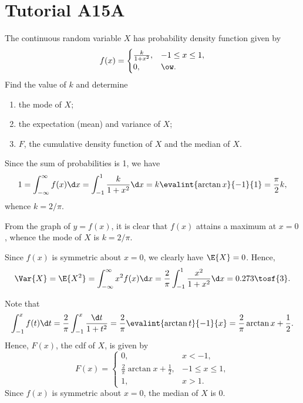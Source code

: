 \section{Tutorial A15A}

\begin{problem}
    The continuous random variable $X$ has probability density function given by \[f(x) = \begin{cases}
        \frac{k}{1 + x^2}, & -1 \leq x \leq 1,\\
        0, & \ow.
    \end{cases}\]
    Find the value of $k$ and determine
    \begin{enumerate}
        \item the mode of $X$;
        \item the expectation (mean) and variance of $X$;
        \item $F$, the cumulative density function of $X$ and the median of $X$.
    \end{enumerate}
\end{problem}
\begin{solution}
    Since the sum of probabilities is 1, we have \[1 = \int_{-\infty}^{\infty} f(x) \d x = \int_{-1}^1 \frac{k}{1 + x^2} \d x = k \evalint{\arctan x}{-1}{1} = \frac\pi2 k,\] whence $k = 2/\pi$.

    \begin{ppart}
        From the graph of $y = f(x)$, it is clear that $f(x)$ attains a maximum at $x = 0$, whence the mode of $X$ is $k = 2/\pi$.
    \end{ppart}
    \begin{ppart}
        Since $f(x)$ is symmetric about $x = 0$, we clearly have $\E{X} = 0$. Hence, \[\Var{X} = \E{X^2} = \int_{-\infty}^\infty x^2 f(x) \d x = \frac2\pi \int_{-1}^1 \frac{x^2}{1 + x^2} \d x = 0.273 \tosf{3}.\]
    \end{ppart}
    \begin{ppart}
        Note that \[\int_{-1}^{x} f(t) \d t = \frac2\pi \int_{-1}^x \frac{\d t}{1 + t^2} = \frac2\pi \evalint{\arctan t}{-1}{x} = \frac2\pi \arctan x + \frac12.\] Hence, $F(x)$, the cdf of $X$, is given by \[F(x) = \begin{cases}
            0, & x < -1,\\
            \frac2\pi \arctan x + \frac12, & -1 \leq x \leq 1,\\
            1, & x > 1.
        \end{cases}\]
        Since $f(x)$ is symmetric about $x = 0$, the median of $X$ is 0.
    \end{ppart}
\end{solution}

